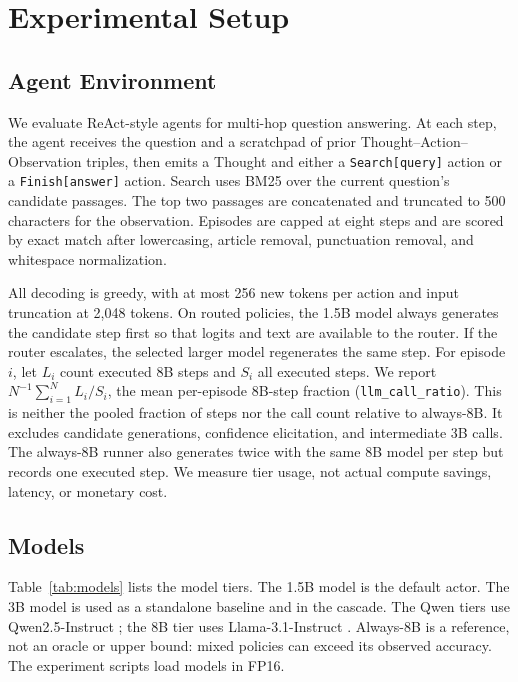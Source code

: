 \documentclass[sigplan,screen,review,anonymous,nonacm]{acmart}
\begin{document}
\section{Experimental Setup}
\label{sec:setup}

\subsection{Agent Environment}

We evaluate ReAct-style agents \cite{react} for multi-hop question answering. At each step,
the agent receives the question and a scratchpad of prior
Thought--Action--Observation triples, then emits a Thought and either a
\texttt{Search[query]} action or a \texttt{Finish[answer]} action. Search uses
BM25 \cite{bm25} over the current question's candidate passages. The top two
passages are concatenated and truncated to 500 characters for the observation. Episodes are capped at eight steps and are
scored by exact match after lowercasing, article removal, punctuation removal,
and whitespace normalization.

All decoding is greedy, with at most 256 new tokens per action and input
truncation at 2,048 tokens. On routed policies, the 1.5B model always generates
the candidate step first so that logits and text are available to the router.
If the router escalates, the selected larger model regenerates the same step.
For episode $i$, let $L_i$ count executed 8B steps and $S_i$ all executed
steps. We report $N^{-1}\sum_{i=1}^{N} L_i/S_i$, the mean per-episode
8B-step fraction (\texttt{llm\_call\_ratio}). This is neither the pooled
fraction of steps nor the call count relative to always-8B. It excludes
candidate generations, confidence elicitation, and intermediate 3B calls.
The always-8B runner also generates twice with the same 8B model per step
but records one executed step. We measure tier usage, not actual compute
savings, latency, or monetary cost.

\subsection{Models}

Table~\ref{tab:models} lists the model tiers. The 1.5B model is the default
actor. The 3B model is used as a standalone baseline and in the cascade.
The Qwen tiers use Qwen2.5-Instruct \cite{qwen25}; the 8B tier uses
Llama-3.1-Instruct \cite{llama3}. Always-8B is a reference, not an oracle
or upper bound: mixed policies can exceed its observed accuracy.
The experiment scripts load models in FP16.
\end{document}
